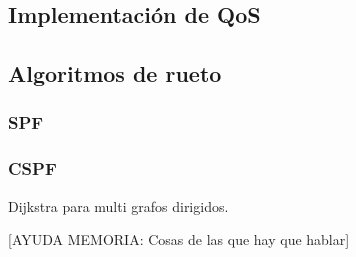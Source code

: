 \subsection{Implementaci\'on de QoS}
\label{5.5.4}

\subsection{Algoritmos de rueto}

\subsubsection{SPF}

\begin{python}

\end{python}
\subsubsection{CSPF}
Dijkstra para multi grafos dirigidos.

[AYUDA MEMORIA: Cosas de las que hay que hablar]

